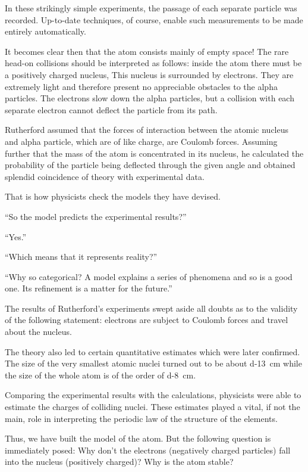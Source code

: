 In these strikingly simple experiments, the passage of each separate particle was recorded. Up-to-date techniques, of course, enable such measurements to be made entirely automatically.

It becomes clear then that the atom consists mainly of empty space! The rare head-on collisions should be interpreted as follows: inside the atom there must be a positively charged nucleus, This nucleus is surrounded by electrons. They are extremely light and therefore present no appreciable obstacles to the alpha particles. The electrons slow down the alpha particles, but a collision with each separate electron cannot deflect the particle from its path.

Rutherford assumed that the forces of interaction between the atomic nucleus and alpha particle, which are of like charge, are Coulomb forces. Assuming further that the mass of the atom is concentrated in its nucleus, he calculated the probability of the particle being deflected through the given angle and obtained splendid coincidence of theory with experimental data.

That is how physicists check the models they have devised.

``So the model predicts the experimental results?'' 

``Yes.''

``Which means that it represents reality?''

``Why so categorical? A model explains a series of phenomena and so is a good one. Its refinement is a matter for the future.''

The results of Rutherford's experiments swept aside all doubts as to the validity of the following statement: electrons are subject to Coulomb forces and travel about the nucleus.

The theory also led to certain quantitative estimates which were later confirmed. The size of the very smallest atomic nuclei turned out to be about \SI{d-13}{\centi\meter} while the size of the whole atom is of the order of \SI{d-8}{\centi\meter}.

Comparing the experimental results with the calculations, physicists were able to estimate the charges of colliding nuclei. These estimates played a vital, if not the main, role in interpreting the periodic law of the structure of the elements.

Thus, we have built the model of the atom. But the following question is immediately posed: Why don't the electrons (negatively charged particles) fall into the nucleus (positively charged)? Why is the atom stable?

